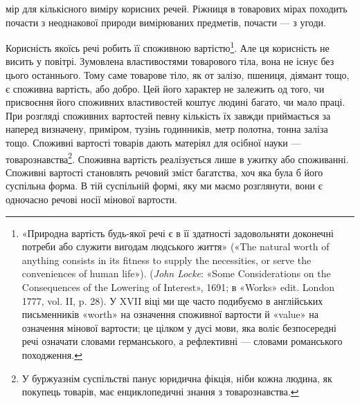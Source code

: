 \parcont{}  %
мір для кількісного виміру корисних речей. Ріжниця в товарових
мірах походить почасти з неоднакової природи вимірюваних
предметів, почасти — з угоди.

Корисність якоїсь речі робить її споживною вартістю\footnote{
«Природна вартість будь-якої речі є в її здатності задовольняти
доконечні потреби або служити вигодам людського життя» («The natural
worth of anything consists in its fitness to supply the necessities, or serve
the conveniences of human life»). (\emph{John Locke}: «Some Considerations
on the Consequences of the Lowering of Interest», 1691; в «Works» edit.
London 1777, vol. II, p. 28). У XVII віці ми ще часто подибуємо в англійських
письменників «worth» на означення споживної вартости й
«value» на означення мінової вартости; це цілком у дусі мови, яка воліє
безпосередні речі означати словами германського, а рефлективні — словами
романського походження.
}. Але ця корисність не висить у повітрі. Зумовлена властивостями товарового
тіла, вона не існує без цього останнього. Тому саме товарове
тіло, як от залізо, пшениця, діямант тощо, є споживна
вартість, або добро. Цей його характер не залежить од того, чи
присвоєння його споживних властивостей коштує людині багато,
чи мало праці. При розгляді споживних вартостей певну кількість
їх завжди приймається за наперед визначену, приміром,
тузінь годинників, метр полотна, тонна заліза тощо. Споживні
вартості товарів дають матеріял для осібної науки — товарознавства\footnote{
У буржуазнім суспільстві панує юридична фікція, ніби кожна людина,
як покупець товарів, має енциклопедичні знання з товарознавства.
}. Споживна вартість реалізується лише в ужитку або споживанні.
Споживні вартості становлять речовий зміст багатства, хоч
яка була б його суспільна форма. В тій суспільній формі, яку ми
маємо розглянути, вони є одночасно речові носії мінової вартости.

